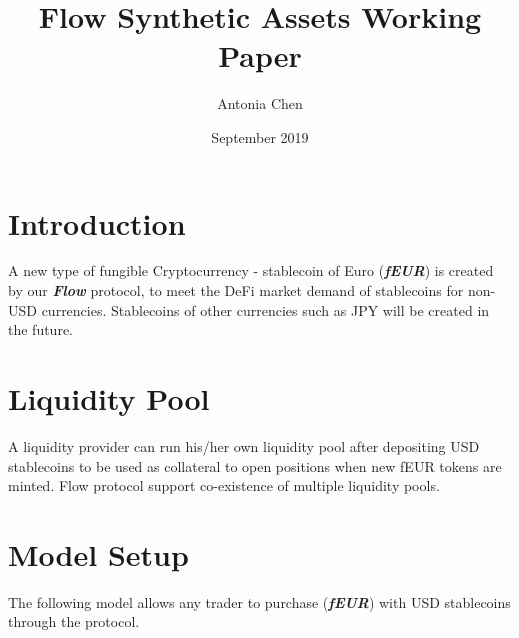 \documentclass{article}
\title{Flow Synthetic Assets Working Paper}
\author{Antonia Chen}
\date{September 2019}
\begin{document}
\maketitle

\section{Introduction}
A new type of fungible Cryptocurrency - stablecoin of Euro  (\textbf{\textit{fEUR}}) is created by our \textbf{\textit{Flow}} protocol, to meet the DeFi market demand of stablecoins for non-USD currencies. Stablecoins of other currencies such as JPY will be created in the future.  

\section{Liquidity Pool}
A liquidity provider can run his/her own liquidity pool after depositing USD stablecoins to be used as collateral to open positions when new fEUR tokens are minted. Flow protocol support co-existence of multiple liquidity pools. 

\section{Model Setup}
The following model allows any trader to purchase  (\textbf{\textit{fEUR}}) with USD stablecoins through the protocol. 
\end{document}
